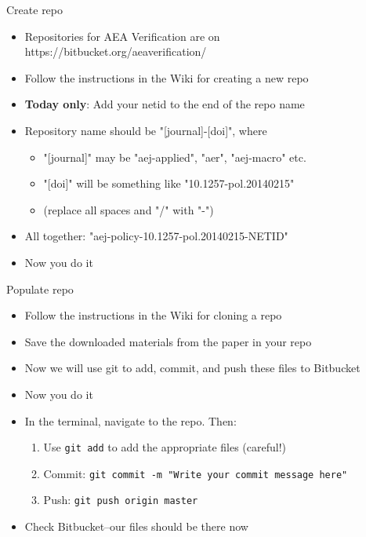 \documentclass[xcolor={dvipsnames}]{beamer}
\theoremstyle{definition}
\begin{document}
\begin{frame}{Create repo}
\begin{itemize}
    \item Repositories for AEA Verification are on https://bitbucket.org/aeaverification/
    \item Follow the instructions in the Wiki for creating a new repo
    \item \textbf{Today only}: Add your netid to the end of the repo name
    \item Repository name should be "[journal]-[doi]", where
    \begin{itemize}
        \item "[journal]" may be "aej-applied", "aer", "aej-macro" etc.
        \item "[doi]" will be something like "10.1257-pol.20140215"
        \item (replace all spaces and "/" with "-")
    \end{itemize}
    \item All together: "aej-policy-10.1257-pol.20140215-NETID"
    \pause
    \item Now you do it
\end{itemize}
\end{frame}

\begin{frame}{Populate repo}
\begin{itemize}
    \item Follow the instructions in the Wiki for cloning a repo
    \item Save the downloaded materials from the paper in your repo
    \item Now we will use git to add, commit, and push these files to Bitbucket
    \pause
    \item Now you do it
    \item In the terminal, navigate to the repo. Then:
    \begin{enumerate}
        \pause
        \item Use \texttt{git add} to add the appropriate files (careful!)
        \pause
        \item Commit: \texttt{git commit -m "Write your commit message here"}
        \pause
        \item Push: \texttt{git push origin master}
    \end{enumerate}
    \pause
    \item Check Bitbucket--our files should be there now
\end{itemize}
\end{frame}
\end{document}
